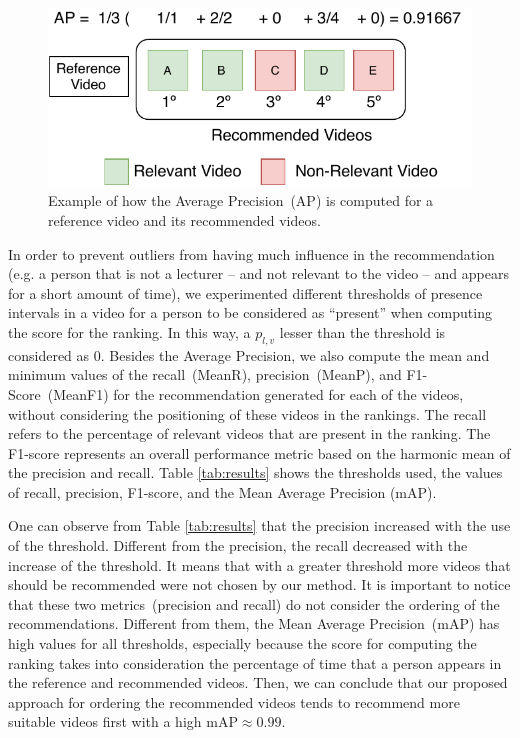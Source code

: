 \begin{figure}[ht]
  \centering
  \includegraphics[width=0.7\linewidth]{img/video_recommendation/ap_example.pdf}
  \caption{Example of how the Average Precision~(AP) is computed for a reference video and its recommended videos.}
  \label{fig:ap_example}
\end{figure}

In order to prevent outliers from having much influence in the recommendation (e.g. a person that is not a lecturer -- and not relevant to the video -- and appears for a short amount of time), we experimented different thresholds of presence intervals in a video for a person to be considered as ``present'' when computing the score for the ranking. 
In this way, a $p_{l,v}$ lesser than the threshold is considered as $0$.
Besides the Average Precision, we also compute the mean and minimum values of the recall~(MeanR), precision~(MeanP), and F1-Score~(MeanF1) for the recommendation generated for each of the videos, without considering the positioning of these videos in the rankings.
The recall refers to the percentage of relevant videos that are present in the ranking.
The F1-score represents an overall performance metric based on the harmonic mean of the precision and recall.
Table \ref{tab:results} shows the thresholds used, the values of recall, precision, F1-score, and the Mean Average Precision (mAP).

One can observe from Table \ref{tab:results} that the precision increased with the use of the threshold.
Different from the precision, the recall decreased with the increase of the threshold. It means that with a greater threshold more videos that should be recommended were not chosen by our method.
It is important to notice that these two metrics~(precision and recall) do not consider the ordering of the recommendations.
Different from them, the Mean Average Precision~(mAP) has high values for all thresholds, especially because the score for computing the ranking takes into consideration the percentage of time that a person appears in the reference and recommended videos.
Then, we can conclude that our proposed approach for ordering the recommended videos tends to recommend more suitable videos first with a high mAP$\approx0.99$. 

